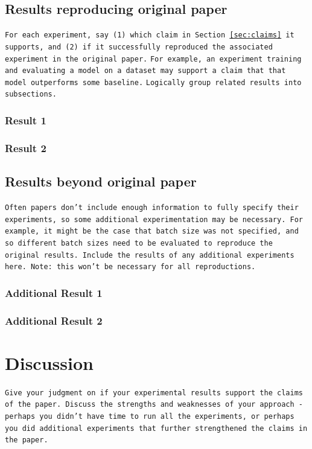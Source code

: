 \documentclass[10pt]{article} %
\begin{document}
\subsection{Results reproducing original paper}
\texttt{For each experiment, say (1) which claim in Section~\ref{sec:claims} it supports, and (2) if it successfully reproduced the associated experiment in the original paper.}
\texttt{For example, an experiment training and evaluating a model on a dataset may support a claim that that model outperforms some baseline.}
\texttt{Logically group related results into subsections.}

\subsubsection{Result 1}
\subsubsection{Result 2}

\subsection{Results beyond original paper}
\texttt{Often papers don't include enough information to fully specify their experiments, so some additional experimentation may be necessary. For example, it might be the case that batch size was not specified, and so different batch sizes need to be evaluated to reproduce the original results. Include the results of any additional experiments here. Note: this won't be necessary for all reproductions.}
 
\subsubsection{Additional Result 1}
\subsubsection{Additional Result 2}

\section{Discussion}

\texttt{Give your judgment on if your experimental results support the claims of the paper. Discuss the strengths and weaknesses of your approach - perhaps you didn't have time to run all the experiments, or perhaps you did additional experiments that further strengthened the claims in the paper.}
\end{document}
